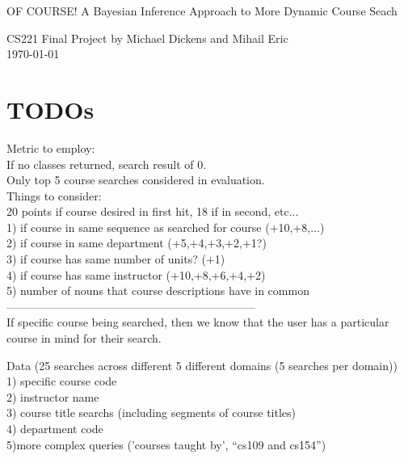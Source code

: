 \documentclass[12pt]{article}
\begin{document}
\begin{center}
{\Large OF COURSE! A Bayesian Inference Approach to More Dynamic Course Seach}
\begin{center}
{\normalsize CS221 Final Project by Michael Dickens and Mihail Eric}\\
\today 
\end{center}

\end{center}



\section*{TODOs}

%
Metric to employ: \\
If no classes returned, search result of 0.\\

Only top 5 course searches considered in evaluation.\\

Things to consider:\\
20 points if course desired in first hit, 18 if in second, etc...\\
1) if course in same sequence as searched for course (+10,+8,...)\\
2) if course in same department (+5,+4,+3,+2,+1?)\\
3) if course has same number of units? (+1)\\
4) if course has same instructor (+10,+8,+6,+4,+2)\\
5) number of nouns that course descriptions have in common\\
------------------------------------------------------------------\\
If specific course being searched, then we know that the user has a particular course in mind for their search.

Data (25 searches across different 5 different domains (5 searches per domain))\\
1) specific course code\\
2) instructor name\\
3) course title searchs (including segments of course titles)\\
4)  department code\\
5)more complex queries ('courses taught by', ``cs109 and cs154'')
\end{document}
